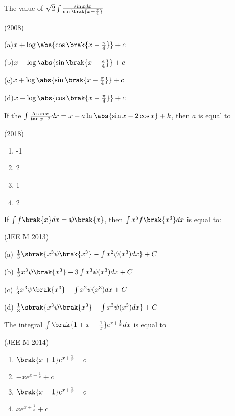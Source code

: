 \iffalse
  \title{INDEFINITE INTEGRALS}
  \author{BADDE VIJAYA SREYAS}
  \section{mains}
\fi

	\item The value of $\sqrt{2}\int\frac{\sin xdx}{\sin \brak{x-\frac{\pi}{4}}}$

		\hfill{(2008)}

		(a)$x+\log\abs{\cos \brak{x-\frac{\pi}{4}}}+c$

		(b)$x-\log\abs{\sin \brak{x-\frac{\pi}{4}}}+c$

		(c)$x+\log\abs{\sin \brak{x-\frac{\pi}{4}}}+c$

		(d)$x-\log\abs{\cos \brak{x-\frac{\pi}{4}}}+c$

	\item If the $\int\frac{5\tan x}{\tan x-2}dx=x+a\ln \abs{\sin x-2\cos x}+k$, then $a$ is equal to

		\hfill{(2018)}

		\begin{multicols}{4}
			\begin{enumerate}
				\item -1
				\item 2
				\item 1
				\item 2
			\end{enumerate}
		\end{multicols}
		
	\item If $\int f\brak{x}dx=\psi\brak{x}$, then $\int x^5f\brak{x^3}dx$ is equal to:

		\hfill{(JEE M 2013)}

		(a) $\frac{1}{3}\sbrak{x^3\psi\brak{x^3}-\int x^2\psi(x^3)dx} + C$

		(b) $\frac{1}{3}x^3\psi\brak{x^3}-3\int x^3\psi(x^3)dx + C$

		(c) $\frac{1}{3}x^3\psi\brak{x^3}-\int x^2\psi(x^3)dx + C$

		(d) $\frac{1}{3}\sbrak{x^3\psi\brak{x^3}-\int x^3\psi(x^3)dx} + C$

	\item The integral $\int\brak{1+x-\frac{1}{x}}e^{x+\frac{1}{x}}dx$ is equal to

		\hfill{(JEE M 2014)}

		\begin{multicols}{2}
			\begin{enumerate}
				\item $\brak{x+1}e^{x+\frac{1}{x}}+c$
				\item $-xe^{x+\frac{1}{x}}+c$
				\item $\brak{x-1}e^{x+\frac{1}{x}}+c$
				\item $xe^{x+\frac{1}{x}}+c$
			\end{enumerate}
		\end{multicols}

